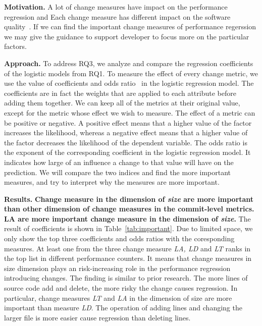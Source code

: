 \textbf{Motivation.}
A lot of change measures have impact on the performance regression and Each change measure has different impact on the software quality~\cite{emadjit}. If we can find the important change measures of performance regerssion we may give the guidance to support developer to focus more on the particular factors.

\textbf{Approach.}
To address RQ3, we analyze and compare the regression coefficients of the logistic models from RQ1. To measure the effect of every change metric, we use the value of coefficients and odds ratio~\cite{Shihab:2010} in the logistic regression model. The coefficients are in fact the weights that are applied to each attribute before adding them together. We can keep all of the metrics at their original value, except for the metric whose effect we wish to measure. %
The effect of a metric can be positive or negative. A positive effect means that a higher value of the factor increases the likelihood, whereas a negative effect means that a higher value of the factor decreases the likelihood of the dependent variable. The odds ratio is the exponent of the corresponding coefficient in the logistic regression model. It indicates how large of an influence a change to that value will have on the prediction. We will compare the two indices and find the more important measures, and try to interpret why the measures are more important.

\textbf{Results.} \textbf{Change measure in the dimension of \emph{size} are more important than other dimension of change measures in the commit-level metrics. LA are more important change measure in the dimension of \emph{size}.} The result of  coefficients is shown in Table~\ref{tab:important}. Due to limited space, we only show the top three coefficients and odds ratios with the coresponding measures. At least one from the  three change measure \emph{LA, LD} and \emph{LT} ranks in the top list in different performance counters. It means that change measures in size dimension plays an risk-increasing role in the performance regression introducing changes. The finding is similar to prior research. The more lines of source code add and delete, the more risky the change causes regression. In particular, change measures \emph{LT} and \emph{LA} in the dimension of size are more important than measure \emph{LD}. The operation of adding lines and changing the larger file is more easier cause regression than deleting lines.

